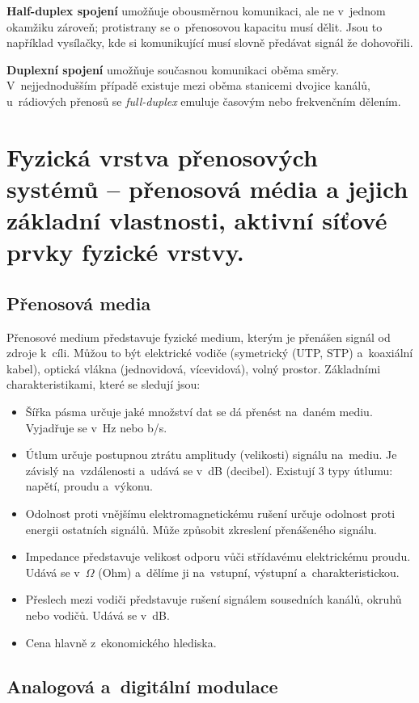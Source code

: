 \textbf{Half-duplex spojení} umožňuje obousměrnou komunikaci, ale ne v~jednom okamžiku zároveň; protistrany se o~přenosovou kapacitu musí dělit. Jsou to například vysílačky, kde si komunikující musí slovně předávat signál že dohovořili.

\textbf{Duplexní spojení} umožňuje současnou komunikaci oběma směry. V~nejjednodušším případě existuje mezi oběma stanicemi dvojice kanálů, u~rádiových přenosů se \emph{full-duplex} emuluje časovým nebo frekvenčním dělením.

\clearpage
\section{Fyzická vrstva přenosových systémů -- přenosová média a jejich základní vlastnosti, aktivní síťové prvky fyzické vrstvy.}

\subsection{Přenosová media}

Přenosové medium představuje fyzické medium, kterým je přenášen signál od zdroje k~cíli. Můžou to být elektrické vodiče (symetrický (UTP, STP) a~koaxiální kabel), optická vlákna (jednovidová, vícevidová), volný prostor.
Základními charakteristikami, které se sledují jsou:

\begin{itemize}[noitemsep]
    \item Šířka pásma určuje jaké množství dat se dá přenést na~daném mediu. Vyjadřuje se v~Hz nebo b/s.
    \item Útlum určuje postupnou ztrátu amplitudy (velikosti) signálu na~mediu. Je závislý na~vzdálenosti a~udává se v~dB (decibel). Existují 3 typy útlumu: napětí, proudu a~výkonu.
    \item Odolnost proti vnějšímu elektromagnetickému rušení určuje odolnost proti energii ostatních signálů. Může způsobit zkreslení přenášeného signálu.
    \item Impedance představuje velikost odporu vůči střídavému elektrickému proudu. Udává se v~$\Omega$ (Ohm) a~dělíme ji na~vstupní, výstupní a~charakteristickou.
    \item Přeslech mezi vodiči představuje rušení signálem sousedních kanálů, okruhů nebo vodičů. Udává se v~dB.
    \item Cena hlavně z~ekonomického hlediska.
\end{itemize}

\subsection{Analogová a~digitální modulace}

